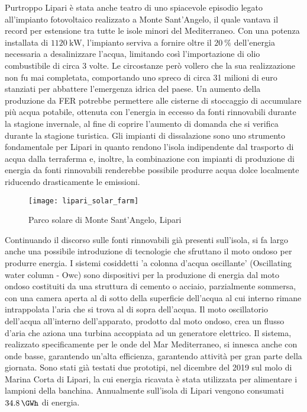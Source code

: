 \documentclass[fleqn,11pt]{SelfArx} %
\begin{document}
Purtroppo Lipari è stata anche teatro di uno spiacevole episodio legato all'impianto fotovoltaico realizzato a Monte Sant'Angelo, il quale vantava il record per estensione tra tutte le isole minori del Mediterraneo. Con una potenza installata di \(\SI{1120}{\kW}\), l'impianto serviva a fornire oltre il \(\SI{20}{\percent}\) dell'energia necessaria a desalinizzare l'acqua, limitando così l'importazione di olio combustibile di circa 3 volte. Le circostanze però vollero che la sua realizzazione non fu mai completata, comportando uno spreco di circa 31 milioni di euro stanziati per abbattere l'emergenza idrica del paese. Un aumento della produzione da FER potrebbe permettere alle cisterne di stoccaggio di accumulare più acqua potabile, ottenuta con l'energia in eccesso da fonti rinnovabili durante la stagione invernale, al fine di coprire l'aumento di domanda che si verifica durante la stagione turistica. Gli impianti di dissalazione sono uno strumento fondamentale per Lipari in quanto rendono l'isola indipendente dal trasporto di acqua dalla terraferma e, inoltre, la combinazione con impianti di produzione di energia da fonti rinnovabili renderebbe possibile produrre acqua dolce localmente riducendo drasticamente le emissioni.

\begin{figure}[ht]\centering
	\texttt{[image: lipari\_solar\_farm]}
	\caption{Parco solare di Monte Sant'Angelo, Lipari}
	\label{fig:lipari_solar_farm}
\end{figure}

Continuando il discorso sulle fonti rinnovabili già presenti sull'isola, si fa largo anche una possibile introduzione di tecnologie che sfruttano il moto ondoso per produrre energia. I sistemi cosiddetti 'a colonna d'acqua oscillante' (Oscillating water column - Owc) sono dispositivi per la produzione di energia dal moto ondoso costituiti da una struttura di cemento o acciaio, parzialmente sommersa, con una camera aperta al di sotto della superficie dell'acqua al cui interno rimane intrappolata l'aria che si trova al di sopra dell'acqua. Il moto oscillatorio dell'acqua all'interno dell'apparato, prodotto dal moto ondoso, crea un flusso d'aria che aziona una turbina accoppiata ad un generatore elettrico. Il sistema, realizzato specificamente per le onde del Mar Mediterraneo, si innesca anche con onde basse, garantendo un'alta efficienza, garantendo attività per gran parte della giornata. Sono stati già testati due prototipi, nel dicembre del 2019 sul molo di Marina Corta di Lipari, la cui energia ricavata è stata utilizzata per alimentare i lampioni della banchina. 
Annualmente sull'isola di Lipari vengono consumati \(\SI{34.8}{\GWh}\) \cite{BandoLega} di energia.
\end{document}
